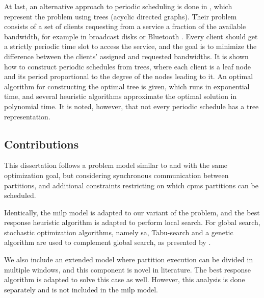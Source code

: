 \documentclass[main.tex]{subfiles}
\begin{document}
At last, an alternative approach to periodic scheduling is done in \textcite{bar2004efficient}, which represent the problem using trees (acyclic directed graphs). 
Their problem consists of a set of clients requesting from a service a fraction of the available bandwidth, for example in broadcast disks or Bluetooth .
Every client should get a strictly periodic time slot to access the service, and the goal is to minimize the difference between the clients' assigned and requested bandwidths.
It is shown how to construct periodic schedules from trees, where each client is a leaf node and its period proportional to the degree of the nodes leading to it.
An optimal algorithm for constructing the optimal tree is given, which runs in exponential time, and several heuristic algorithms approximate the optimal solution in polynomial time.
It is noted, however, that not every periodic schedule has a tree representation.

\subsection{Contributions}

This dissertation follows a problem model similar to \textcite{al2010partition} and with the same optimization goal, but considering synchronous communication between partitions, and additional constraints restricting on which \glspl{cpm} partitions can be scheduled.

Identically, the \gls{milp} model is adapted to our variant of the problem, and the best response heuristic algorithm \cite{al2012strictly, pira2016line} is adapted to perform local search.
For global search, stochastic optimization algorithms, namely \gls{sa}, Tabu-search and a genetic algorithm are used to complement global search, as presented by \textcite{pinedo2008scheduling}.

We also include an extended model where partition execution can be divided in multiple windows, and this component is novel in literature.
The best response algorithm is adapted to solve this case as well.
However, this analysis is done separately and is not included in the \gls{milp} model.
\end{document}
